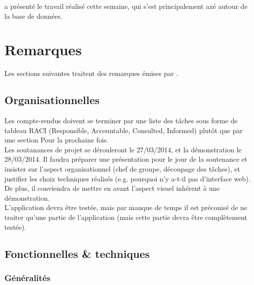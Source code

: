 \documentclass[11pt,fleqn]{report}
\begin{document}
\amo a présenté le travail réalisé cette semaine, qui s'est principalement axé autour de la base de données. 


\section{Remarques}

Les sections suivantes traitent des remarques émises par \mo.

\subsection{Organisationnelles}

Les compte-rendus doivent se terminer par une liste des tâches sous forme de tableau RACI (Responsible, Accountable, Consulted, Informed) plutôt que par une section \og{}Pour la prochaine fois\fg{}.\\
Les soutanances de projet se dérouleront le 27/03/2014, et la démonstration le 28/03/2014. Il faudra préparer une présentation pour le jour de la soutenance et insister sur l'aspect organisationnel (chef de groupe, découpage des tâches), et justifier les choix techniques réalisés (e.g. pourquoi n'y a-t-il pas d'interface web). De plus, il conviendra de mettre en avant l'aspect visuel inhérent à une démonstration.\\
L'application devra être testée, mais par manque de temps il est préconisé de ne traiter qu'une partie de l'application (mais cette partie devra être complètement testée).


\subsection{Fonctionnelles \& techniques}

\subsubsection{Généralités}
\end{document}
